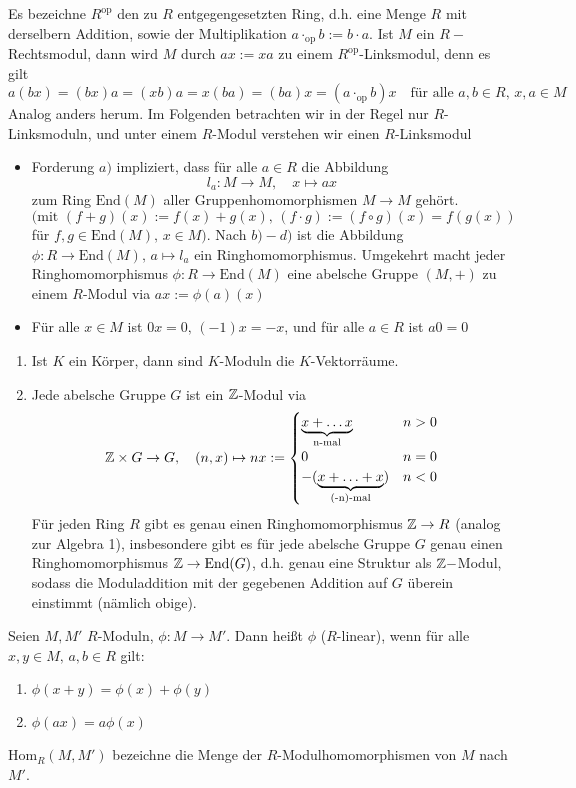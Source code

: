 \begin{anm}
	Es bezeichne $R^\text{op}$ den zu $R$ entgegengesetzten Ring, d.h. eine Menge $R$ mit derselbern Addition, sowie der Multiplikation $a \cdot_\text{op}b := b \cdot a$. Ist $M$ ein $R-$Rechtsmodul, dann wird $M$ durch $ax:= xa$ zu einem $R^\text{op}$-Linksmodul, denn es gilt 
	$$a(bx) = (bx)a = (xb)a = x(ba) = (ba)x = (a \cdot_\text{op} b)x \quad \text{für alle } a,b\in R, \, x,a\in M$$
	Analog anders herum. Im Folgenden betrachten wir in der Regel nur $R$-Linksmoduln, und unter einem $R$-Modul verstehen wir einen $R$-Linksmodul
	\begin{itemize}
		\item Forderung $a)$ impliziert, dass für alle $a\in R$ die Abbildung 
		$$l_a: M \to M, \quad x\mapsto ax$$
		zum Ring $\text{End}(M)$ aller Gruppenhomomorphismen $M\to M$ gehört.
		$$(\text{mit } (f+g)(x) := f(x) + g(x), \, (f\cdot g) := (f\circ g)(x) = f(g(x))$$für $f,g\in \text{End}(M), \, x\in M)$. Nach $b)-d)$ ist die Abbildung $\phi:R\to \text{End}(M), \, a\mapsto l_a$ ein Ringhomomorphismus. Umgekehrt macht jeder Ringhomomorphismus $\phi:R\to \text{End}(M)$ eine abelsche Gruppe $(M,+)$ zu einem $R$-Modul via $ax:= \phi(a)(x)$
		\item Für alle $x\in M$ ist $0x=0, \, (-1)x=-x$, und für alle $a\in R$ ist $a0=0$ 
	\end{itemize}
\end{anm}
\begin{bsp}\label{bsp1.2}
	\begin{enumerate}[label=\alph*)]
		\item Ist $K$ ein Körper, dann sind $K$-Moduln die $K$-Vektorräume.
		\item Jede abelsche Gruppe $G$ ist ein $\mathbb{Z}$-Modul via
		$$\mathbb{Z}\times G\to G, \quad (n,x) \mapsto nx:= \begin{cases} \underbrace{x+ \ldots x}_{\text{n-mal}}& n>0 \\
		0 & n=0\\
		-(\underbrace{x+ \ldots + x}_{\text{(-n)-mal}}) & n<0
		\end{cases}$$
		Für jeden Ring $R$ gibt es genau einen Ringhomomorphismus $\mathbb{Z}\to R$ (analog zur Algebra 1), insbesondere gibt es für jede abelsche Gruppe $G$ genau einen Ringhomomorphismus $\mathbb{Z}\to \text{End}(G)$, d.h. genau eine Struktur als $\mathbb{Z}-$Modul, sodass die Moduladdition mit der gegebenen Addition auf $G$ überein einstimmt (nämlich obige).
	\end{enumerate}
\end{bsp}
\begin{df}\label{df1.3}
	Seien $M,M'$ $R$-Moduln, $\phi:M \to M'$. Dann heißt $\phi$  ($R$-linear), wenn für alle $x,y\in M, \, a,b\in R$ gilt: 
	\begin{enumerate}[label=\alph*)]
		\item $\phi(x+y) = \phi(x) + \phi(y)$
		\item $\phi(ax) = a\phi(x)$
	\end{enumerate}
	$\text{Hom}_R(M, M')$ bezeichne die Menge der $R$-Modulhomomorphismen von $M$ nach $M'$.
\end{df}
